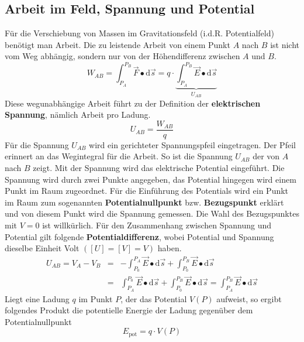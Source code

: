 \subsection{Arbeit im Feld, Spannung und Potential}
Für die Verschiebung von Massen im Gravitationsfeld (i.d.R. Potentialfeld) benötigt man Arbeit. Die zu leistende Arbeit von einem Punkt $A$ nach $B$ ist nicht vom Weg abhängig, sondern nur von der Höhendifferenz zwischen $A$ und $B$.
\begin{equation}
\boxed{W_{AB}=\displaystyle \int_{P_A}^{P_B}\overrightarrow{F}\bullet \text{d}\overrightarrow{s}=q\cdot \underbrace{\displaystyle\int_{P_A}^{P_B}\overrightarrow{E}\bullet \text{d}\overrightarrow{s}}_{U_{AB}}}
\end{equation}
Diese wegunabhängige Arbeit führt zu der Definition der \textbf{elektrischen Spannung}, nämlich Arbeit pro Ladung.
\begin{equation}
\boxed{U_{AB}=\dfrac{W_{AB}}{q}}
\end{equation}
Für die Spannung $U_{AB}$ wird ein gerichteter Spannungspfeil eingetragen. Der Pfeil erinnert an das Wegintegral für die Arbeit. So ist die Spannung $U_{AB}$ der von $A$ nach $B$ zeigt.
\newline\newline
Mit der Spannung wird das elektrische Potential eingeführt. Die Spannung wird durch zwei Punkte angegeben, das Potential hingegen wird einem Punkt im Raum zugeordnet. Für die Einführung des Potentials wird ein Punkt im Raum zum sogenannten \textbf{Potentialnullpunkt} bzw. \textbf{Bezugspunkt} erklärt und von diesem Punkt wird die Spannung gemessen. Die Wahl des Bezugspunktes mit $V=0$ ist willkürlich. Für den Zusammenhang zwischen Spannung und Potential gilt folgende \textbf{Potentialdifferenz}, wobei Potential und Spannung dieselbe Einheit Volt $\left([U]=[V]=V\right)$ haben.
\begin{equation}
\boxed{
\begin{array}{lll}
U_{AB}=V_A-V_B&=&-\displaystyle \int_{P_0}^{P_A}\overrightarrow{E}\bullet \text{d}\overrightarrow{s}+\displaystyle \int_{P_0}^{P_B}\overrightarrow{E}\bullet \text{d}\overrightarrow{s}\\
&=&\displaystyle \int_{P_A}^{P_0}\overrightarrow{E}\bullet \text{d}\overrightarrow{s}+\displaystyle \int_{P_0}^{P_B}\overrightarrow{E}\bullet \text{d}\overrightarrow{s}=\displaystyle \int_{P_A}^{P_B}\overrightarrow{E}\bullet \text{d}\overrightarrow{s}
\end{array}
}
\end{equation}
Liegt eine Ladung $q$ im Punkt $P$, der das Potential $V\left(P\right)$ aufweist, so ergibt folgendes Produkt die potentielle Energie der Ladung gegenüber dem Potentialnullpunkt
\begin{equation}
\boxed{E_{\text{pot}}=q\cdot V\left(P\right)}
\end{equation}
